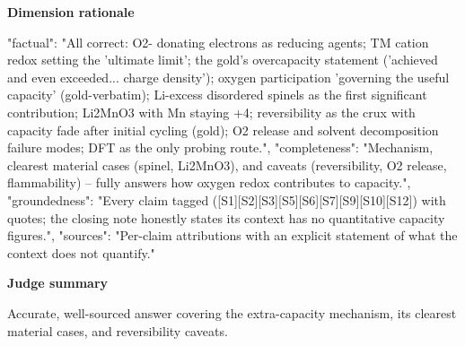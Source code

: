\documentclass[10pt]{article}
\begin{document}
\textbf{Dimension rationale}
\begin{EvidenceText}
{
  "factual": "All correct: O2- donating electrons as reducing agents; TM cation redox setting the 'ultimate limit'; the gold's overcapacity statement ('achieved and even exceeded... charge density'); oxygen participation 'governing the useful capacity' (gold-verbatim); Li-excess disordered spinels as the first significant contribution; Li2MnO3 with Mn staying +4; reversibility as the crux with capacity fade after initial cycling (gold); O2 release and solvent decomposition failure modes; DFT as the only probing route.",
  "completeness": "Mechanism, clearest material cases (spinel, Li2MnO3), and caveats (reversibility, O2 release, flammability) -- fully answers how oxygen redox contributes to capacity.",
  "groundedness": "Every claim tagged ([S1][S2][S3][S5][S6][S7][S9][S10][S12]) with quotes; the closing note honestly states its context has no quantitative capacity figures.",
  "sources": "Per-claim attributions with an explicit statement of what the context does not quantify."
}
\end{EvidenceText}

\textbf{Judge summary}
\begin{EvidenceText}
Accurate, well-sourced answer covering the extra-capacity mechanism, its clearest material cases, and reversibility caveats.
\end{EvidenceText}
\end{document}
